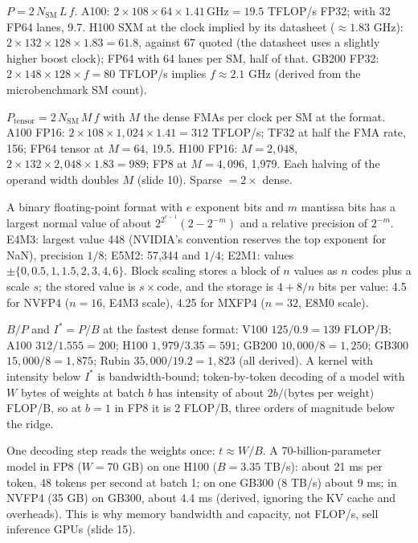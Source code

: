 \documentclass[11pt,letterpaper]{article}
\begin{document}
\begin{description}[leftmargin=0pt,labelindent=0pt,itemsep=6pt,font=\normalfont\bfseries\sffamily]\sloppy
\item[FP32 and FP64 peak.] $P = 2\,N_{\mathrm{SM}}\,L\,f$. A100: $2\times 108\times 64\times 1.41\,\mathrm{GHz} = 19.5$ TFLOP/s FP32; with 32 FP64 lanes, 9.7. H100 SXM at the clock implied by its datasheet ($\approx 1.83$ GHz): $2\times 132\times 128\times 1.83 = 61.8$, against 67 quoted (the datasheet uses a slightly higher boost clock); FP64 with 64 lanes per SM, half of that. GB200 FP32: $2\times 148\times 128\times f = 80$ TFLOP/s implies $f \approx 2.1$ GHz (derived from the microbenchmark SM count).
\item[Tensor peak.] $P_{\text{tensor}} = 2\,N_{\mathrm{SM}}\,M\,f$ with $M$ the dense FMAs per clock per SM at the format. A100 FP16: $2\times 108\times 1{,}024\times 1.41 = 312$ TFLOP/s; TF32 at half the FMA rate, 156; FP64 tensor at $M = 64$, 19.5. H100 FP16: $M = 2{,}048$, $2\times 132\times 2{,}048\times 1.83 = 989$; FP8 at $M = 4{,}096$, 1{,}979. Each halving of the operand width doubles $M$ (slide 10). Sparse $= 2\times$ dense.
\item[Format arithmetic.] A binary floating-point format with $e$ exponent bits and $m$ mantissa bits has a largest normal value of about $2^{2^{e-1}}(2 - 2^{-m})$ and a relative precision of $2^{-m}$. E4M3: largest value 448 (NVIDIA's convention reserves the top exponent for NaN), precision $1/8$; E5M2: 57{,}344 and $1/4$; E2M1: values $\pm\{0, 0.5, 1, 1.5, 2, 3, 4, 6\}$. Block scaling stores a block of $n$ values as $n$ codes plus a scale $s$; the stored value is $s\times\text{code}$, and the storage is $4 + 8/n$ bits per value: 4.5 for NVFP4 ($n = 16$, E4M3 scale), 4.25 for MXFP4 ($n = 32$, E8M0 scale).
\item[Bytes per FLOP and the ridge.] $B/P$ and $I^\ast = P/B$ at the fastest dense format: V100 $125/0.9 = 139$ FLOP/B; A100 $312/1.555 = 200$; H100 $1{,}979/3.35 = 591$; GB200 $10{,}000/8 = 1{,}250$; GB300 $15{,}000/8 = 1{,}875$; Rubin $35{,}000/19.2 = 1{,}823$ (all derived). A kernel with intensity below $I^\ast$ is bandwidth-bound; token-by-token decoding of a model with $W$ bytes of weights at batch $b$ has intensity of about $2b/\text{(bytes per weight)}$ FLOP/B, so at $b = 1$ in FP8 it is 2 FLOP/B, three orders of magnitude below the ridge.
\item[Decode time from bandwidth.] One decoding step reads the weights once: $t \approx W/B$. A 70-billion-parameter model in FP8 ($W = 70$ GB) on one H100 ($B = 3.35$ TB/s): about 21 ms per token, 48 tokens per second at batch 1; on one GB300 (8 TB/s) about 9 ms; in NVFP4 (35 GB) on GB300, about 4.4 ms (derived, ignoring the KV cache and overheads). This is why memory bandwidth and capacity, not FLOP/s, sell inference GPUs (slide 15).

\end{description}
\end{document}
